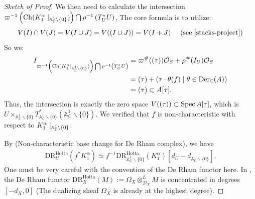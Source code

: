 \begin{proof}[Sketch of Proof]
    We then need to calculate the intersection $\varpi^{-1}\left(\operatorname{Ch}(K_1^\alpha\mid_{\mathbb{A}^1_{\mathbb{C}}\backslash\{0\}})\right) \bigcap \rho^{-1}\left(T^\ast_U U\right)$,
    The core formula is to utilize:
    \[
        V(I)\cap V(J) = V(I \cup J) = V((I \cup J)) = V(I+J)  \quad  \text{ (see \cite[\href{https://stacks.math.columbia.edu/tag/00E0}{Tag 00E0}]{stacks-project})}
    \]
    So we:
    \begin{align*}
        I_{\varpi^{-1}\left(\operatorname{Ch}(K_1^\alpha\mid_{\mathbb{A}^1_{\mathbb{C}}\backslash\{0\}})\right)\bigcap \rho^{-1}\left(T^\ast_U U\right)}
         & = \varpi^\#((\tau))\mathcal{O}_S + \rho^\#(I_U)\mathcal{O}_S         \\
         & = (\tau) + (\tau \cdot \theta(f) \mid \theta \in \operatorname{Der}_\mathbb{C}(A)) \\
         & = (\tau) \subset A[\tau].
    \end{align*}
    Thus, the intersection is exactly the zero space $V((\tau)) \subset \operatorname{Spec} A[\tau]$,
    which is $U \times_{\mathbb{A}^1_{\mathbb{C}}\backslash\{0\}} T^\ast_{\mathbb{A}^1_{\mathbb{C}}\backslash\{0\}} (\mathbb{A}^1_{\mathbb{C}}\backslash\{0\})$.
    We verified that $f$ is non-characteristic with respect to $K_1^\alpha\mid_{\mathbb{A}^1_{\mathbb{C}}\setminus\{0\}}$.

    \medskip

    By \cite[Proposition~4.7.6]{hotta2008d} (Non-characteristic base change for De Rham complex), we have
    \begin{align*}
        \mathrm{DR}^{\mathrm{Hotta}}_{U}(f^* K_1^\alpha) \simeq f^{-1} \mathrm{DR}^{\mathrm{Hotta}}_{\mathbb{A}^1_{\mathbb{C}}\backslash\{0\}}(K_1^\alpha)[d_U - d_{\mathbb{A}^1_{\mathbb{C}}\backslash\{0\}}].
    \end{align*}
    One must be very careful with the convention of the De Rham functor here. In \cite[Sect.~4.7]{hotta2008d},
    the De Rham functor $\mathrm{DR}^{\mathrm{Hotta}}_X(M) := \Omega_X \otimes_{\mathcal{D}_X}^L M$ is concentrated in degrees $[-d_X, 0]$
    (The dualizing sheaf $\Omega_X$ is already at the highest degree).


\end{proof}
